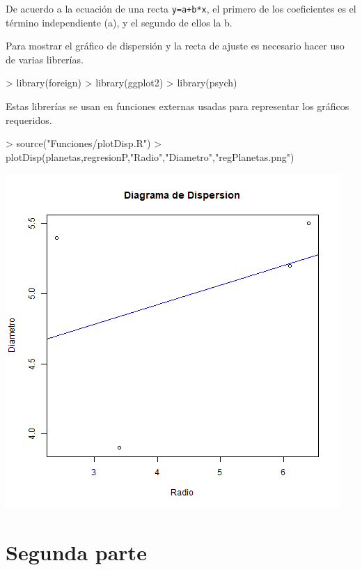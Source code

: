 \documentclass [a4paper] {article}
\begin{document}
\bigskip
De acuerdo a la ecuación de una recta \texttt{y=a+b*x}, el primero de los coeficientes es el término independiente (a), y el segundo
de ellos la b.

\bigskip
Para mostrar el gráfico de dispersión y la recta de ajuste es necesario hacer uso de varias librerías.
\begin{Schunk}
\begin{Sinput}
> library(foreign)
> library(ggplot2)
> library(psych)
\end{Sinput}
\end{Schunk}

\bigskip
Estas librerías se usan en funciones externas usadas para representar los gráficos requeridos.
\begin{Schunk}
\begin{Sinput}
> source("Funciones/plotDisp.R")
> plotDisp(planetas,regresionP,"Radio","Diametro","regPlanetas.png")
\end{Sinput}
\end{Schunk}
\includegraphics[width=\textwidth]{regPlanetas}


\section{Segunda parte}
\end{document}
